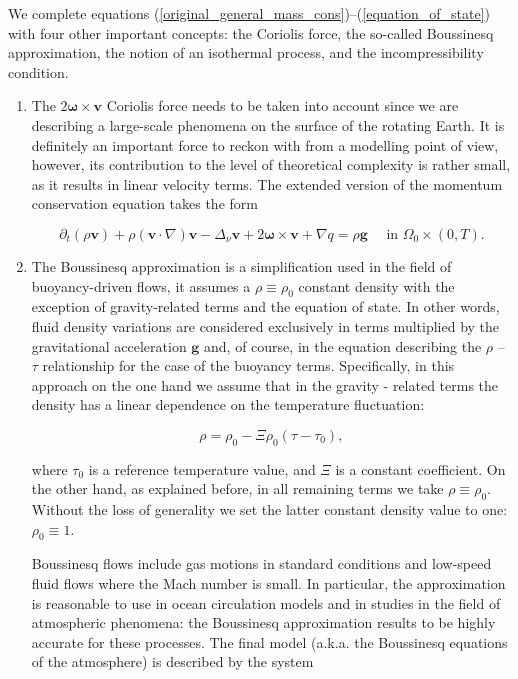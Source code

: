 \documentclass[12pt]{report}
\numberwithin{theorem}{chapter}
\numberwithin{corollary}{chapter}
\numberwithin{lemma}{chapter}
\numberwithin{remark}{chapter}
\numberwithin{definition}{chapter}
\numberwithin{prop}{chapter}
\begin{document}
We complete equations (\ref{original_general_mass_cons})--(\ref{equation_of_state}) with four other important concepts: the Coriolis force, the so-called Boussinesq approximation, the notion of an isothermal process, and the incompressibility condition.

\begin{enumerate}

\item The $2 \mathbf{\omega} \times \mathbf{v}$ Coriolis force needs to be taken into account since we are describing a large-scale phenomena on the surface of the rotating Earth. It is definitely an important force to reckon with from a modelling point of view, however, its contribution to the level of theoretical complexity is rather small, as it results in linear velocity terms. The extended version of the momentum conservation equation takes the form

\begin{equation} \label{original_general_NS_coriolis}
  \partial_t (\rho \mathbf{v}) + \rho (\mathbf{v} \cdot \nabla)\mathbf{v} -\Delta_{\nu} \mathbf{v} + 2 \mathbf{\omega} \times \mathbf{v} + \nabla q = \rho \mathbf{g} \quad \text{ in } \Omega_0 \times (0,T).
\end{equation}

\item The Boussinesq approximation is a simplification used in the field of buoyancy-driven flows, it assumes a $\rho \equiv \rho_0$ constant density with the exception of gravity-related terms and the equation of state. In other words, fluid density variations are considered exclusively in terms multiplied by the gravitational acceleration $\mathbf{g}$ and, of course, in the equation describing the $\rho$ -- $\tau$ relationship for the case of the buoyancy terms. Specifically, in this approach on the one hand we assume that in the gravity - related terms the density has a linear dependence on the temperature fluctuation:

\begin{equation}
  \rho = \rho_0 - \Xi \rho_0(\tau-\tau_0),
\end{equation}

where $\tau_0$ is a reference temperature value, and $\Xi$ is a constant coefficient. On the other hand, as explained before, in all remaining terms we take $\rho \equiv \rho_0.$ Without the loss of generality we set the latter constant density value to one: $\rho_0 \equiv 1.$

Boussinesq flows include gas motions in standard conditions and low-speed fluid flows where the Mach number is small. In particular, the approximation is reasonable to use in ocean circulation models and in studies in the field of atmospheric phenomena: the Boussinesq approximation results to be highly accurate for these processes. The final model (a.k.a. the Boussinesq equations of the atmosphere) is described by the system


\end{enumerate}
\end{document}
